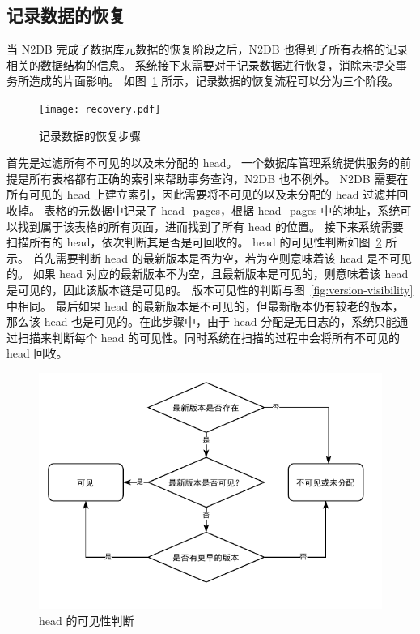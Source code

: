 \subsection{记录数据的恢复}
\label{ssec:record-recovery}

当 N2DB 完成了数据库元数据的恢复阶段之后，N2DB 也得到了所有表格的记录相关的数据结构的信息。
系统接下来需要对于记录数据进行恢复，消除未提交事务所造成的片面影响。
如图~\ref{fig:record-recovery} 所示，记录数据的恢复流程可以分为三个阶段。

\begin{figure}[ht]
    \centering
    \texttt{[image: recovery.pdf]}
    \caption{记录数据的恢复步骤}
    \label{fig:record-recovery}
\end{figure}

首先是过滤所有不可见的以及未分配的 head。
一个数据库管理系统提供服务的前提是所有表格都有正确的索引来帮助事务查询，N2DB 也不例外。
N2DB 需要在所有可见的 head 上建立索引，因此需要将不可见的以及未分配的 head 过滤并回收掉。
表格的元数据中记录了 head\_pages，根据 head\_pages 中的地址，系统可以找到属于该表格的所有页面，进而找到了所有 head 的位置。
接下来系统需要扫描所有的 head，依次判断其是否是可回收的。
head 的可见性判断如图~\ref{fig:head-visibility} 所示。
首先需要判断 head 的最新版本是否为空，若为空则意味着该 head 是不可见的。
如果 head 对应的最新版本不为空，且最新版本是可见的，则意味着该 head 是可见的，因此该版本链是可见的。
版本可见性的判断与图~\ref{fig:version-visibility} 中相同。
最后如果 head 的最新版本是不可见的，但最新版本仍有较老的版本，那么该 head 也是可见的。在此步骤中，由于 head 分配是无日志的，系统只能通过扫描来判断每个 head 的可见性。同时系统在扫描的过程中会将所有不可见的 head 回收。

\begin{figure}[ht]
    \centering
    \includegraphics[width=1\linewidth]{figures/head_visibility.pdf}
    \caption{head 的可见性判断}
    \label{fig:head-visibility}
\end{figure}

